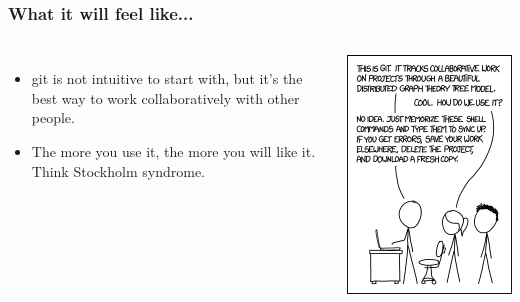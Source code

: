 \documentclass{beamer}
\begin{document}
\begin{frame}
\frametitle{What it will feel like...}
\begin{columns}
\begin{itemize}
\item git is not intuitive to start with, but it's the best way to work collaboratively with other people.
\item The more you use it, the more you will like it. Think Stockholm syndrome.
\end{itemize}
\includegraphics[width=\textwidth]{gitxkcd.png}
\end{columns}
\end{frame}
\end{document}
